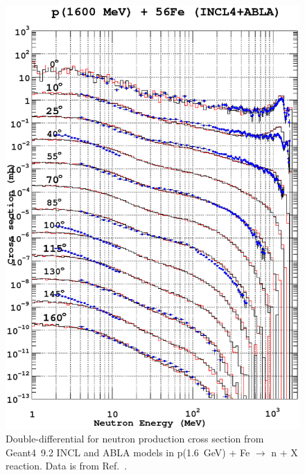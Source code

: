 \documentclass[a4paper]{jpconf}
\begin{document}
\begin{figure}
\begin{center}
\includegraphics[scale=0.70]{images/proton1600MeVFev1.eps}
\caption{\label{fig:neutronFe}Double-differential for neutron production cross section
    from Geant4~9.2 INCL and ABLA models in p(1.6~GeV) + Fe $\rightarrow$ n + X reaction.
Data is from Ref.~\cite{data}.}

\end{center}

\end{figure}
\end{document}

